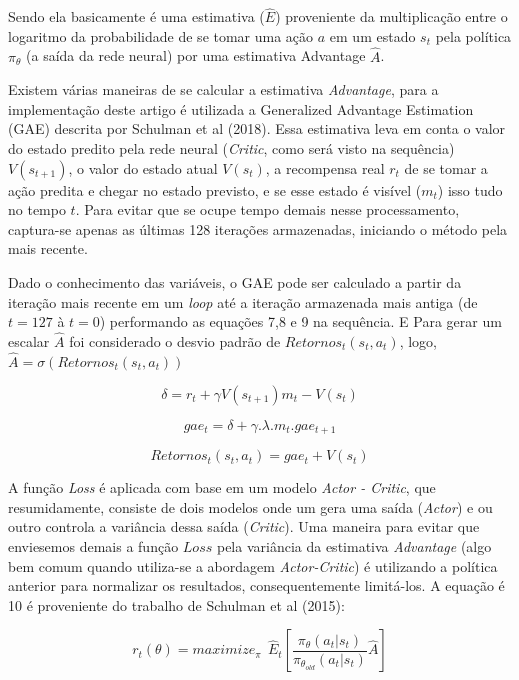 \documentclass[letterpaper]{article} %
\begin{document}
Sendo ela basicamente é uma estimativa ($\hat{E}$) proveniente da multiplicação entre o logaritmo da probabilidade de se tomar uma ação $a$ em um estado $s_t$ pela política $\pi_{\theta}$ (a saída da rede neural) por uma estimativa Advantage $\hat{A}$. 

Existem várias maneiras de se calcular a estimativa \textit{Advantage}, para a implementação deste artigo é utilizada a Generalized Advantage Estimation (GAE) descrita por Schulman et al (2018). Essa estimativa leva em conta o valor do estado predito pela rede neural (\textit{Critic}, como será visto na sequência) $V(s_{t+1})$, o valor do estado atual  $V(s_t)$, a recompensa real $r_t$ de se tomar a ação predita e chegar no estado previsto, e se esse estado é visível ($m_t$) isso tudo no tempo $t$. Para evitar que se ocupe tempo demais nesse processamento, captura-se apenas as últimas 128 iterações armazenadas, iniciando o método pela mais recente.

Dado o conhecimento das variáveis, o GAE pode ser calculado a partir da iteração mais recente em um \textit{loop} até a iteração armazenada mais antiga (de $t=127$ à $t=0$) performando as equações 7,8 e 9 na sequência. E Para gerar um escalar $\hat{A}$ foi considerado o desvio padrão de $Retornos_t(s_t, a_t)$, logo, $\hat{A} = \sigma(Retornos_t(s_t, a_t))$


\begin{equation}
\delta = r_t + \gamma V(s_{t+1}) m_t - V(s_t)
\end{equation}

\begin{equation}
gae_t = \delta + \gamma . \lambda . m_t . gae_{t+1}
\end{equation}

\begin{equation}
Retornos_t(s_t, a_t) = gae_t + V(s_t)
\end{equation}


A função \textit{Loss} é aplicada com base em um modelo \textit{Actor - Critic}, que resumidamente, consiste de dois modelos onde um gera uma saída (\textit{Actor}) e ou outro controla a variância dessa saída (\textit{Critic}). Uma maneira para evitar que enviesemos demais a função $Loss$ pela variância da estimativa \textit{Advantage} (algo bem comum quando utiliza-se a abordagem \textit{Actor-Critic}) é utilizando a política anterior para normalizar os resultados, consequentemente limitá-los. A equação é 10 é proveniente do trabalho de Schulman et al (2015):

\begin{equation}
r_t(\theta) = maximize_\pi \ \ \hat{E}_t \left[ \frac{\pi_{\theta}(a_t|s_t)}{\pi_{\theta_{old}}(a_t | s_t)} \hat{A} \right]
\end{equation}
\end{document}
